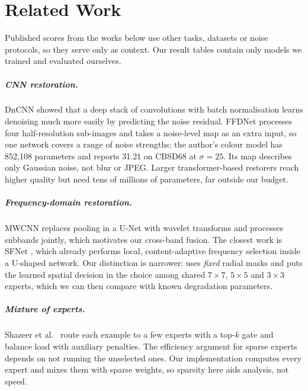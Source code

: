 \chapter{Related Work}\label{ch:literature}

Published scores from the works below use other tasks, datasets or noise
protocols, so they serve only as context. Our result tables contain only
models we trained and evaluated ourselves.

\paragraph{CNN restoration.} DnCNN \cite{zhang2017dncnn} showed that a deep
stack of convolutions with batch normalisation learns denoising much more
easily by predicting the noise residual. FFDNet \cite{zhang2018ffdnet}
processes four half-resolution sub-images and takes a noise-level map as an
extra input, so one network covers a range of noise strengths; the author's
colour model has 852,108 parameters and reports 31.21\dB{} on CBSD68 at
$\sigma=25$. Its map describes only Gaussian noise, not blur or JPEG. Larger
transformer-based restorers reach higher quality but need tens of millions of
parameters, far outside our budget.

\paragraph{Frequency-domain restoration.} MWCNN \cite{liu2018mwcnn} replaces
pooling in a U-Net with wavelet transforms and processes subbands jointly,
which motivates our cross-band fusion. The closest work is SFNet
\cite{cui2023sfnet}, which already performs local, content-adaptive frequency
selection inside a U-shaped network. Our distinction is narrower: \fcsg{}
uses \emph{fixed} radial masks and puts the learned spatial decision in the
choice among shared $7\times7$, $5\times5$ and $3\times3$ experts, which we
can then compare with known degradation parameters.

\paragraph{Mixture of experts.} Shazeer et al.\ \cite{shazeer2017moe} route
each example to a few experts with a top-$k$ gate and balance load with
auxiliary penalties. The efficiency argument for sparse experts depends on
not running the unselected ones. Our implementation computes every expert and
mixes them with sparse weights, so sparsity here aids analysis, not speed.

